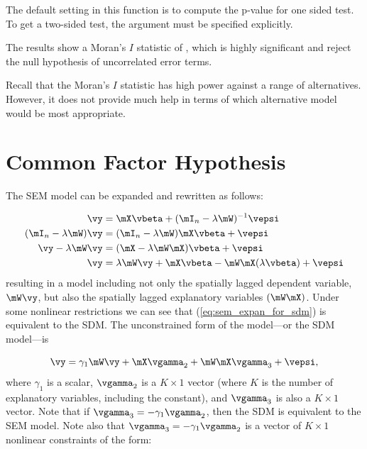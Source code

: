 \documentclass[english,12pt]{book}\usepackage[]{graphicx}\usepackage[]{xcolor}
\begin{document}
The default setting in this function is to compute the p-value for one sided test. To get a two-sided test, the  argument must be specified explicitly. 

The results show a Moran's $I$ statistic of  , which is highly significant and reject the null hypothesis of uncorrelated error terms. 

Recall that the Moran's $I$ statistic has high power against a range of alternatives. However, it does not provide much help in terms of which alternative model would be most appropriate.

\section{Common Factor Hypothesis}

The SEM model can be expanded and rewritten as follows:

\begin{equation}\label{eq:sem_expan_for_sdm}
  \begin{aligned}
    \vy & = \mX\vbeta + (\mI_n - \lambda\mW)^{-1}\vepsi \\
    (\mI_n - \lambda\mW)\vy &= (\mI_n - \lambda\mW)\mX\vbeta + \vepsi \\
    \vy - \lambda\mW\vy &= (\mX - \lambda\mW\mX)\vbeta + \vepsi \\
    \vy &= \lambda\mW\vy + \mX\vbeta - \mW\mX(\lambda\vbeta) + \vepsi
  \end{aligned}
\end{equation}
%
resulting in a model including not only the spatially lagged dependent variable, $\mW\vy$, but also the spatially lagged explanatory variables $(\mW\mX)$. Under some nonlinear restrictions we can see that (\ref{eq:sem_expan_for_sdm}) is equivalent to the SDM. The unconstrained form of the model---or the SDM model---is

\begin{equation}\label{eq:sem_restricted}
  \vy  = \gamma_1\mW\vy + \mX\vgamma_2 + \mW\mX\vgamma_3 + \vepsi,
\end{equation}
%
where $\gamma_1$ is a scalar, $\vgamma_2$ is a $K\times 1$ vector (where $K$ is the number of explanatory variables, including the constant), and $\vgamma_3$ is also a $K\times 1$ vector. Note that  if $\vgamma_3 = -\gamma_1\vgamma_2$, then the SDM is equivalent to the SEM model. Note also that $\vgamma_3 = -\gamma_1\vgamma_2$ is a vector of $K\times 1$ nonlinear constraints of the form:
\end{document}

